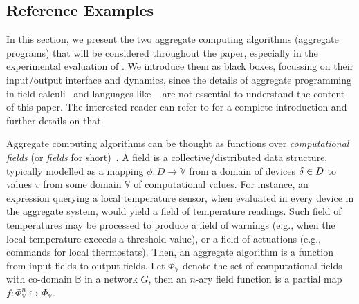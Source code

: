 \subsection{Reference Examples}
\label{acsos2022:s:background:ac-prog}

In this section,
 we present the two aggregate computing algorithms (aggregate programs)
 that will be considered throughout the paper,
 especially in the experimental evaluation of .
%
We introduce them as black boxes, 
 focussing on their input/output interface and dynamics,
 since the details of aggregate programming in field calculi~\cite{DBLP:journals/computer/BealPV15,DBLP:journals/jlap/ViroliBDACP19}
 and languages like \scafi{}~\cite{DBLP:conf/isola/CasadeiVAD20}
 are not essential to understand the content of this paper. 
%
The interested reader can refer to \cite{DBLP:journals/jlap/ViroliBDACP19,DBLP:conf/isola/CasadeiVAD20,DBLP:journals/eaai/CasadeiVAPD21} for a complete introduction and further details on that.

Aggregate computing algorithms
 can be thought as functions
 over \emph{computational fields} (or \emph{fields} for short)~\cite{DBLP:journals/jlap/ViroliBDACP19,DBLP:journals/pervasive/MameiZL04}.
%
A field is a collective/distributed data structure,
 typically modelled as 
 a mapping $\phi: D \to \mathbb{V}$
 from a domain of devices $\delta \in D$
 to values $v$ from some domain $\mathbb{V}$ of computational values.
%
For instance,
 an expression querying a local temperature sensor,
 when evaluated in every device in the aggregate system,
 would yield a field of temperature readings.
%
Such field of temperatures may be processed
 to produce a field of warnings (e.g., when the local temperature exceeds a threshold value),
 or a field of actuations (e.g., commands for local thermostats).
%
Then,
 an aggregate algorithm
 is a function from input fields to output fields.
%
Let $\Phi_\mathbb{V}$ denote the set of computational fields with co-domain $\mathbb{B}$ in a network $G$,
 then an $n$-ary field function is a partial map
 $f: \Phi_\mathbb{V}^n \hookrightarrow \Phi_\mathbb{V}$.
 
